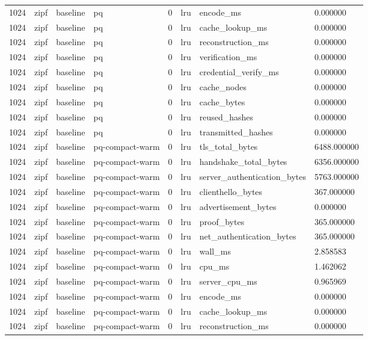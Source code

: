 \begin{tabular}{llllllll}
1024 & zipf & baseline & pq & 0 & lru & encode\_ms & 0.000000 \\
1024 & zipf & baseline & pq & 0 & lru & cache\_lookup\_ms & 0.000000 \\
1024 & zipf & baseline & pq & 0 & lru & reconstruction\_ms & 0.000000 \\
1024 & zipf & baseline & pq & 0 & lru & verification\_ms & 0.000000 \\
1024 & zipf & baseline & pq & 0 & lru & credential\_verify\_ms & 0.000000 \\
1024 & zipf & baseline & pq & 0 & lru & cache\_nodes & 0.000000 \\
1024 & zipf & baseline & pq & 0 & lru & cache\_bytes & 0.000000 \\
1024 & zipf & baseline & pq & 0 & lru & reused\_hashes & 0.000000 \\
1024 & zipf & baseline & pq & 0 & lru & transmitted\_hashes & 0.000000 \\
1024 & zipf & baseline & pq-compact-warm & 0 & lru & tls\_total\_bytes & 6488.000000 \\
1024 & zipf & baseline & pq-compact-warm & 0 & lru & handshake\_total\_bytes & 6356.000000 \\
1024 & zipf & baseline & pq-compact-warm & 0 & lru & server\_authentication\_bytes & 5763.000000 \\
1024 & zipf & baseline & pq-compact-warm & 0 & lru & clienthello\_bytes & 367.000000 \\
1024 & zipf & baseline & pq-compact-warm & 0 & lru & advertisement\_bytes & 0.000000 \\
1024 & zipf & baseline & pq-compact-warm & 0 & lru & proof\_bytes & 365.000000 \\
1024 & zipf & baseline & pq-compact-warm & 0 & lru & net\_authentication\_bytes & 365.000000 \\
1024 & zipf & baseline & pq-compact-warm & 0 & lru & wall\_ms & 2.858583 \\
1024 & zipf & baseline & pq-compact-warm & 0 & lru & cpu\_ms & 1.462062 \\
1024 & zipf & baseline & pq-compact-warm & 0 & lru & server\_cpu\_ms & 0.965969 \\
1024 & zipf & baseline & pq-compact-warm & 0 & lru & encode\_ms & 0.000000 \\
1024 & zipf & baseline & pq-compact-warm & 0 & lru & cache\_lookup\_ms & 0.000000 \\
1024 & zipf & baseline & pq-compact-warm & 0 & lru & reconstruction\_ms & 0.000000 \\

\end{tabular}
